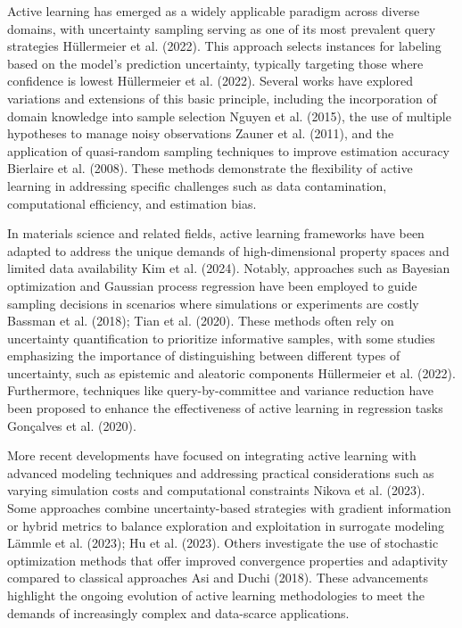 Active learning has emerged as a widely applicable paradigm across diverse domains, with uncertainty sampling serving as one of its most prevalent query strategies Hüllermeier et al. (2022). This approach selects instances for labeling based on the model's prediction uncertainty, typically targeting those where confidence is lowest Hüllermeier et al. (2022). Several works have explored variations and extensions of this basic principle, including the incorporation of domain knowledge into sample selection Nguyen et al. (2015), the use of multiple hypotheses to manage noisy observations Zauner et al. (2011), and the application of quasi-random sampling techniques to improve estimation accuracy Bierlaire et al. (2008). These methods demonstrate the flexibility of active learning in addressing specific challenges such as data contamination, computational efficiency, and estimation bias.

In materials science and related fields, active learning frameworks have been adapted to address the unique demands of high-dimensional property spaces and limited data availability Kim et al. (2024). Notably, approaches such as Bayesian optimization and Gaussian process regression have been employed to guide sampling decisions in scenarios where simulations or experiments are costly Bassman et al. (2018); Tian et al. (2020). These methods often rely on uncertainty quantification to prioritize informative samples, with some studies emphasizing the importance of distinguishing between different types of uncertainty, such as epistemic and aleatoric components Hüllermeier et al. (2022). Furthermore, techniques like query-by-committee and variance reduction have been proposed to enhance the effectiveness of active learning in regression tasks Gonçalves et al. (2020).

More recent developments have focused on integrating active learning with advanced modeling techniques and addressing practical considerations such as varying simulation costs and computational constraints Nikova et al. (2023). Some approaches combine uncertainty-based strategies with gradient information or hybrid metrics to balance exploration and exploitation in surrogate modeling Lämmle et al. (2023); Hu et al. (2023). Others investigate the use of stochastic optimization methods that offer improved convergence properties and adaptivity compared to classical approaches Asi and Duchi (2018). These advancements highlight the ongoing evolution of active learning methodologies to meet the demands of increasingly complex and data-scarce applications.

